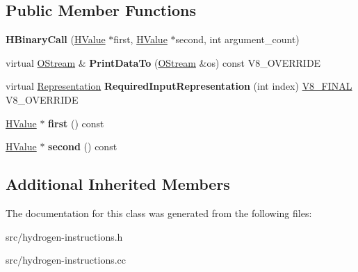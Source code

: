 \subsection*{Public Member Functions}
\begin{DoxyCompactItemize}
\item 
\hypertarget{classv8_1_1internal_1_1_h_binary_call_ab826c7aadd4a8ca53a6670b9f3a9cb20}{}{\bfseries H\+Binary\+Call} (\hyperlink{classv8_1_1internal_1_1_h_value}{H\+Value} $\ast$first, \hyperlink{classv8_1_1internal_1_1_h_value}{H\+Value} $\ast$second, int argument\+\_\+count)\label{classv8_1_1internal_1_1_h_binary_call_ab826c7aadd4a8ca53a6670b9f3a9cb20}

\item 
\hypertarget{classv8_1_1internal_1_1_h_binary_call_acba3807b71f8b241b2405368608e1fbd}{}virtual \hyperlink{classv8_1_1internal_1_1_o_stream}{O\+Stream} \& {\bfseries Print\+Data\+To} (\hyperlink{classv8_1_1internal_1_1_o_stream}{O\+Stream} \&os) const V8\+\_\+\+O\+V\+E\+R\+R\+I\+D\+E\label{classv8_1_1internal_1_1_h_binary_call_acba3807b71f8b241b2405368608e1fbd}

\item 
\hypertarget{classv8_1_1internal_1_1_h_binary_call_a30809bdeeaef294e42ef256356badd94}{}virtual \hyperlink{classv8_1_1internal_1_1_representation}{Representation} {\bfseries Required\+Input\+Representation} (int index) \hyperlink{classv8_1_1internal_1_1_v8___f_i_n_a_l}{V8\+\_\+\+F\+I\+N\+A\+L} V8\+\_\+\+O\+V\+E\+R\+R\+I\+D\+E\label{classv8_1_1internal_1_1_h_binary_call_a30809bdeeaef294e42ef256356badd94}

\item 
\hypertarget{classv8_1_1internal_1_1_h_binary_call_a612e65856e385927bb9649dfce373a85}{}\hyperlink{classv8_1_1internal_1_1_h_value}{H\+Value} $\ast$ {\bfseries first} () const \label{classv8_1_1internal_1_1_h_binary_call_a612e65856e385927bb9649dfce373a85}

\item 
\hypertarget{classv8_1_1internal_1_1_h_binary_call_a9f95766f11cd55df02257ca08663178f}{}\hyperlink{classv8_1_1internal_1_1_h_value}{H\+Value} $\ast$ {\bfseries second} () const \label{classv8_1_1internal_1_1_h_binary_call_a9f95766f11cd55df02257ca08663178f}

\end{DoxyCompactItemize}
\subsection*{Additional Inherited Members}


The documentation for this class was generated from the following files\+:\begin{DoxyCompactItemize}
\item 
src/hydrogen-\/instructions.\+h\item 
src/hydrogen-\/instructions.\+cc\end{DoxyCompactItemize}
